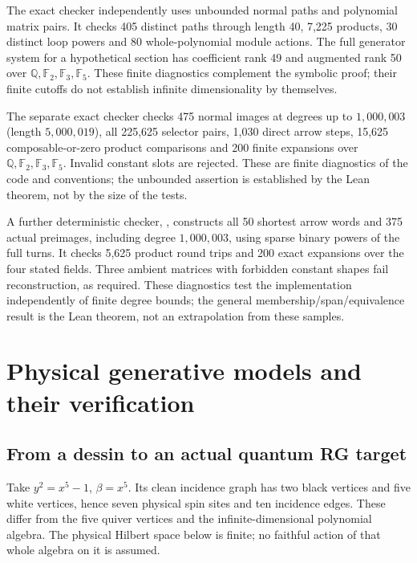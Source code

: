 \documentclass[11pt]{article}
\theoremstyle{definition}\newtheorem{definition}[theorem]{Definition}
\theoremstyle{remark}\newtheorem{remark}[theorem]{Remark}
\begin{document}
The exact checker  independently
uses unbounded normal paths and polynomial matrix pairs. It checks
405 distinct paths through length 40, 7,225 products, 30 distinct loop
powers and 80 whole-polynomial module actions. The full generator system
for a hypothetical section has coefficient rank 49 and augmented rank 50
over $\mathbb Q,\mathbb F_2,\mathbb F_3,\mathbb F_5$.
These finite diagnostics complement the symbolic proof; their finite
cutoffs do not establish infinite dimensionality by themselves.


The separate exact checker 
checks 475 normal images at degrees up to $1{,}000{,}003$ (length
$5{,}000{,}019$), all 225,625 selector pairs, 1,030 direct arrow steps,
15,625 composable-or-zero product comparisons and 200 finite expansions
over $\mathbb Q,\mathbb F_2,\mathbb F_3,\mathbb F_5$. Invalid constant
slots are rejected. These are finite diagnostics of the code and
conventions; the unbounded assertion is established by the Lean theorem,
not by the size of the tests.


A further deterministic checker,
, constructs all 50 shortest
arrow words and 375 actual preimages, including degree $1{,}000{,}003$,
using sparse binary powers of the full turns. It checks 5,625 product
round trips and 200 exact expansions over the four stated fields.
Three ambient matrices with forbidden constant shapes fail reconstruction,
as required. These diagnostics test the implementation independently of
finite degree bounds; the general membership/span/equivalence result is
the Lean theorem, not an extrapolation from these samples.

\section{Physical generative models and their verification}\label{lf:details}
\subsection{From a dessin to an actual quantum RG target}
Take $y^2=x^5-1$, $\beta=x^5$. Its clean incidence graph has two black
vertices and five white vertices, hence seven physical spin sites and ten
incidence edges. These differ from the five quiver vertices and the
infinite-dimensional polynomial algebra. The physical Hilbert space below
is finite; no faithful action of that whole algebra on it is assumed.
\end{document}

